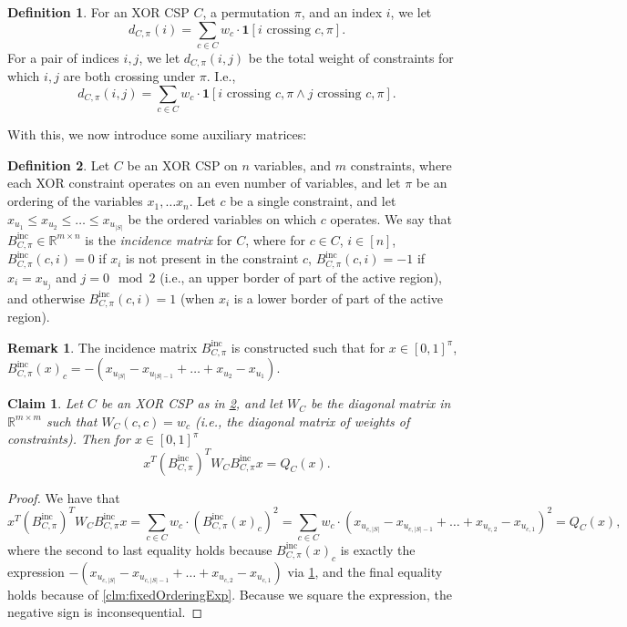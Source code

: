 \documentclass[11pt]{article}
\newtheorem{claim}[theorem]{Claim}
\theoremstyle{definition}
\newtheorem{definition}{Definition}[section]
\newtheorem{remark}[theorem]{Remark}
\newcommand{\R}{\mathbb{R}}
\begin{document}
\begin{definition}\label{def:NumberCrossing}
	For an XOR CSP $C$, a permutation $\pi$, and an index $i$, we let
    \[
	 d_{C, \pi}(i) = \sum_{c \in C} w_c \cdot \mathbf{1}[i \text{ crossing } c,\pi].
	\]
    For a pair of
    indices $i, j$, we let $d_{C, \pi}(i,j)$ be the total weight of constraints for which $i,j$ are both crossing under $\pi$. I.e.,
	\[
	 d_{C, \pi}(i,j) = \sum_{c \in C} w_c \cdot \mathbf{1}[i \text{ crossing } c,\pi \wedge j \text{ crossing } c,\pi].
	\]
\end{definition}

With this, we now introduce some auxiliary matrices:

\begin{definition}\label{def:incMatrixXOR}
	Let $C$ be an XOR CSP on $n$ variables, and $m$ constraints, where each XOR constraint operates on an even number of variables, and let $\pi$ be an ordering of the variables $x_1, \dots x_n$. Let $c$ be a single constraint, and let $x_{u_1} \leq x_{u_2} \leq \dots \leq x_{u_{|S|}}$ be the ordered variables on which $c$ operates. We say that $B^{\text{inc}}_{C, \pi} \in \R^{m \times n}$ is the \emph{incidence matrix} for $C$, where for $c \in C$, $i \in [n]$, $B^{\text{inc}}_{C, \pi}(c, i) = 0$ if $x_i$ is not present in the constraint $c$, $B^{\text{inc}}_{C, \pi}(c, i) = -1$ if $x_i = x_{u_j}$ and $j = 0 \mod 2$ (i.e., an upper border of part of the active region), and otherwise $B^{\text{inc}}_{C, \pi}(c, i) = 1$ (when $x_i$ is a lower border of part of the active region). 
\end{definition}

\begin{remark}\label{rmk:incidence}
	The incidence matrix $B^{\text{inc}}_{C, \pi}$ is constructed such that for $x \in [0,1]^{\pi}$, $B^{\text{inc}}_{C, \pi}(x)_c = -(x_{u_{|S|}} - x_{u_{|S|-1}} + \dots + x_{u_2} - x_{u_1})$.
\end{remark}

\begin{claim}\label{clm:quadraticEquivalence}
	Let $C$ be an XOR CSP as in \cref{def:incMatrixXOR}, and let $W_C$ be the diagonal matrix in $\R^{m \times m}$ such that $W_C(c, c) = w_c$ (i.e., the diagonal matrix of weights of constraints). Then for $x \in [0,1]^{\pi}$
	\[
	x^T (B^{\text{inc}}_{C, \pi})^T W_C B^{\text{inc}}_{C, \pi} x = Q_C(x).
	\]
\end{claim}

\begin{proof}
	We have that 
	\[
	x^T (B^{\text{inc}}_{C, \pi})^T W_C B^{\text{inc}}_{C, \pi} x = \sum_{c \in C} w_c \cdot (B^{\text{inc}}_{C, \pi}(x)_c)^2 = \sum_{c \in C} w_c \cdot (x_{u_{c, |S|}} - x_{u_{c, |S|-1}} + \dots + x_{u_{c, 2}} - x_{u_{c, 1}})^2 = Q_C(x),
	\]
	where the second to last equality holds because $B^{\text{inc}}_{C, \pi}(x)_c$ is exactly the expression $-(x_{u_{c, |S|}} - x_{u_{c, |S|-1}} + \dots + x_{u_{c, 2}} - x_{u_{c, 1}})$ via \cref{rmk:incidence}, and the final equality holds because of \cref{clm:fixedOrderingExp}. Because we square the expression, the negative sign is inconsequential.
\end{proof}
\end{document}
